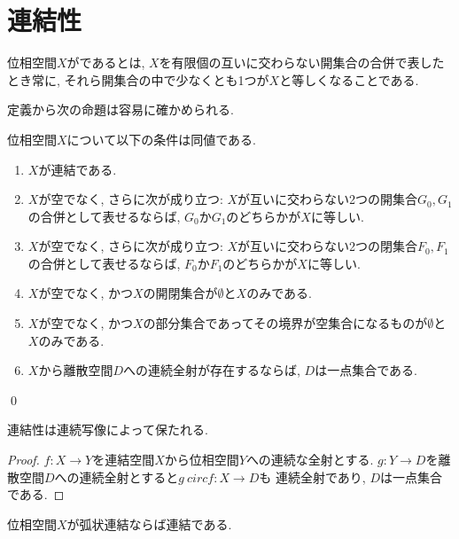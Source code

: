 \documentclass[uplatex, dvipdfmx, a4paper, 12pt, class=jsbook, crop=false]{standalone}
\begin{document}
\section{連結性}
\label{sec:connected-spaces}

\begin{definition}
	位相空間$ X $がであるとは, $ X $を有限個の互いに交わらない開集合の合併で表したとき常に, それら開集合の中で少なくとも1つが$ X $と等しくなることである.
\end{definition}

定義から次の命題は容易に確かめられる.
\begin{proposition}
	位相空間$ X $について以下の条件は同値である.
		\begin{enumerate}
			\item $ X $が連結である.
			\item $ X $が空でなく, さらに次が成り立つ: $ X $が互いに交わらない2つの開集合$ G_0, G_1 $の合併として表せるならば,
			      $ G_0 $か$ G_1 $のどちらかが$ X $に等しい.
			\item $ X $が空でなく, さらに次が成り立つ: $ X $が互いに交わらない2つの閉集合$ F_0, F_1 $の合併として表せるならば,
			$ F_0 $か$ F_1 $のどちらかが$ X $に等しい.
			\item $ X $が空でなく, かつ$ X $の開閉集合が$ \emptyset $と$ X $のみである.
			\item $ X $が空でなく, かつ$ X $の部分集合であってその境界が空集合になるものが$ \emptyset $と$ X $のみである.
			\item $ X $から離散空間$ D $への連続全射が存在するならば, $ D $は一点集合である.
		\end{enumerate}
		\qed
\end{proposition}

\begin{proposition}
	\label{prop:Continuous maps preserve connectedness}
	連結性は連続写像によって保たれる.
\end{proposition}

\begin{proof}
	$ f \colon X \to Y $を連結空間$ X $から位相空間$ Y $への連続な全射とする.
	$ g \colon Y \to D $を離散空間$ D $への連続全射とすると$ g\ circ f \colon X \to D $も
	連続全射であり, $ D $は一点集合である.
\end{proof}

\begin{proposition}
	\label{prop:PathCtd>Ctd}
	位相空間$ X $が弧状連結ならば連結である.
\end{proposition}
\end{document}
